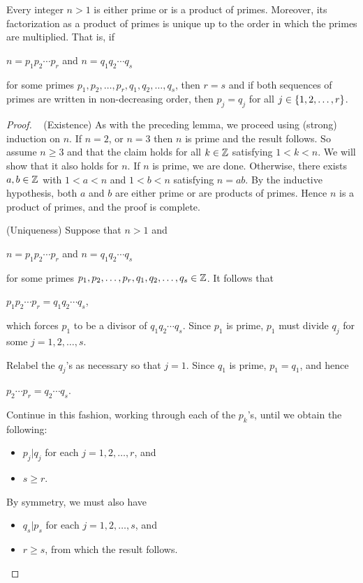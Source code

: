 \documentclass[11pt,fleqn,dvipsnames,usenames]{article}
\newcommand{\p}{\noindent}
\begin{document}
\begin{theorem}
Every integer $n > 1$ is either prime or is a product of primes.  Moreover, its factorization as a product of primes is unique up to the order in which the primes are multiplied.  That is, if
\begin{center}
$n = p_{1}p_{2}\cdots p_{r}$ and $n = q_{1}q_{2}\cdots q_{s}$
\end{center}
for some primes $p_{1},p_{2},\ldots, p_{r},q_{1},q_{2},\ldots,q_{s}$, then $r = s$ and if both sequences of primes are written in non-decreasing order, then $p_{j} = q_{j}$ for all $j\in\left\{1,2,\ldots, r\right\}$.
\end{theorem}
%
\begin{proof}~
\p (Existence) As with the preceding lemma, we proceed using (strong) induction on $n$.  If $n=2$, or $n=3$ then $n$ is prime and the result follows.  So assume $n\geq 3$ and that the claim holds for all $k\in\mathbb{Z}$ satisfying $1 < k < n$.  We will show that it also holds for $n$.  If $n$ is prime, we are done.  Otherwise, there exists $a,b\in\mathbb{Z}$ with $1 < a < n$ and $1 < b < n$ satisfying $n = ab$.  By the inductive hypothesis, both $a$ and $b$ are either prime or are products of primes.  Hence $n$ is a product of primes, and the proof is complete.
\vsp

\p (Uniqueness) Suppose that $n > 1$ and 
\begin{center}
$n = p_{1}p_{2}\cdots p_{r}$ and $n = q_{1}q_{2}\cdots q_{s}$
\end{center}
for some primes $p_{1},p_{2},\ldots,p_{r},q_{1},q_{2},\ldots, q_{s}\in \mathbb{Z}$.  It follows that
\begin{center}
$p_{1}p_{2}\cdots p_{r} = q_{1}q_{2}\cdots q_{s}$,
\end{center}
which forces $p_{1}$ to be a divisor of $q_{1}q_{2}\cdots q_{s}$.  Since $p_{1}$ is prime, $p_{1}$ must divide $q_{j}$ for some $j=1,2,\ldots, s$.
\vsp

\p Relabel the $q_{j}$'s as necessary so that $j=1$.  Since $q_{1}$ is prime, $p_{1} = q_{1}$, and hence
\begin{center}
$p_{2}\cdots p_{r} = q_{2}\cdots q_{s}$.
\end{center}
Continue in this fashion, working through each of the $p_{k}$'s, until we obtain the following:
\begin{itemize}
\item $p_{j}|q_{j}$ for each $j=1,2,\ldots, r$, and
\item $s\geq r$.
\end{itemize}
By symmetry, we must also have
\begin{itemize}
\item $q_{s}|p_{s}$ for each $j=1,2,\ldots, s$, and 
\item $r\geq s$, from which the result follows.\qedhere
\end{itemize}
\end{proof}
\end{document}
